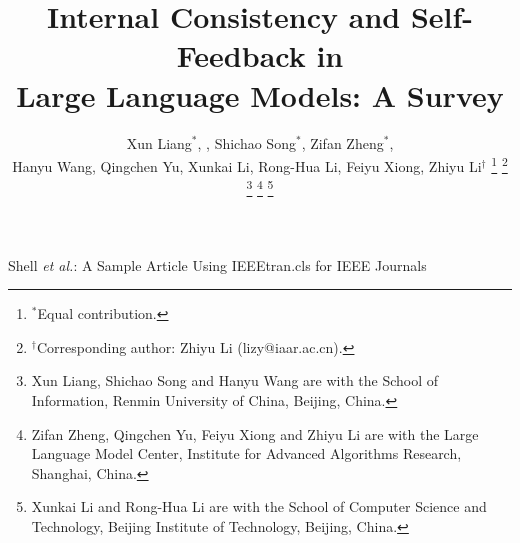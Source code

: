 \documentclass[lettersize,journal]{IEEEtran}
\begin{document}

\title{Internal Consistency and Self-Feedback in \\ Large Language Models: A Survey}

\author{Xun Liang$^*$, , Shichao Song$^*$, Zifan Zheng$^*$, \\ Hanyu Wang, Qingchen Yu, Xunkai Li, Rong-Hua Li, Feiyu Xiong, Zhiyu Li$^\dag$
\thanks{$^*$Equal contribution.}
\thanks{$^\dag$Corresponding author: Zhiyu Li (lizy@iaar.ac.cn).}
\thanks{Xun Liang, Shichao Song and Hanyu Wang are with the School of Information, Renmin University of China, Beijing, China.}
\thanks{Zifan Zheng, Qingchen Yu, Feiyu Xiong and Zhiyu Li are with the Large Language Model Center, Institute for Advanced Algorithms Research, Shanghai, China.}
\thanks{Xunkai Li and Rong-Hua Li are with the School of Computer Science and Technology, Beijing Institute of Technology, Beijing, China.}
}



%
{Shell \MakeLowercase{\textit{et al.}}: A Sample Article Using IEEEtran.cls for IEEE Journals}




\maketitle
\end{document}
